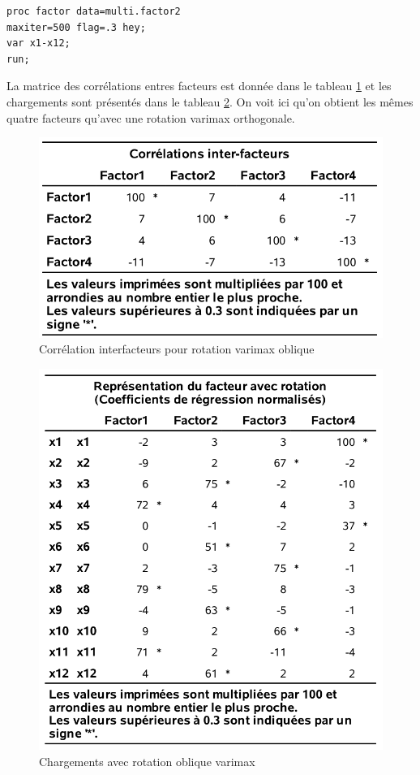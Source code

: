 \documentclass[
]{book}
\theoremstyle{definition}
\theoremstyle{definition}
\theoremstyle{definition}
\theoremstyle{remark}
\begin{document}
\begin{verbatim}
proc factor data=multi.factor2
maxiter=500 flag=.3 hey;
var x1-x12;
run;
\end{verbatim}

La matrice des corrélations entres facteurs est donnée dans le tableau \ref{fig:fig1p13} et les chargements sont présentés dans le tableau \ref{fig:fig1p14}. On voit ici qu'on obtient les mêmes quatre facteurs qu'avec une rotation varimax orthogonale.

\begin{figure}

{\centering \includegraphics[width=0.7\linewidth]{figures/01-facto-e13} 

}

\caption{Corrélation interfacteurs pour rotation varimax oblique}\label{fig:fig1p13}
\end{figure}

\begin{figure}

{\centering \includegraphics[width=0.7\linewidth]{figures/01-facto-e14} 

}

\caption{Chargements avec rotation oblique varimax}\label{fig:fig1p14}
\end{figure}
\end{document}
